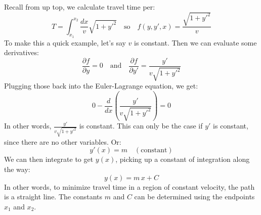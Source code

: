 \documentclass[10pt]{article}
\begin{document}
Recall from up top, we calculate travel time per:
$$
T =
\displaystyle\int_{x_1}^{x_2} \frac{dx}{v} \sqrt{1 + y'^2}
\quad \mathrm{so} \quad
f(y, y', x) = \frac{\sqrt{1 + y'^2}}{v}
$$
To make this a quick example, let's say $v$ is constant. Then we can evaluate some derivatives:
$$
\frac{\partial f}{\partial y} = 0
\quad \mathrm{and} \quad
\frac{\partial f}{\partial y'} = \frac{y'}{ v \sqrt{1 + y'^2} }
$$
Plugging those back into the Euler-Lagrange equation, we get:
$$
0 - \frac{d}{dx} \left( \frac{y'}{ v \sqrt{1 + y'^2} } \right) = 0
$$
In other words, $\frac{y'}{ v \sqrt{1 + y'^2} }$ is constant. This can only be the case if $y'$ is constant, since there are no other variables. Or:
$$
y'(x) = m \quad \mathrm{(constant)}
$$
We can then integrate to get $y(x)$, picking up a constant of integration along the way:
$$
y(x) = m \, x + C
$$
In other words, to minimize travel time in a region of constant velocity, the path is a straight line. The constants $m$ and $C$ can be determined using the endpoints $x_1$ and $x_2$. 
\end{document}
